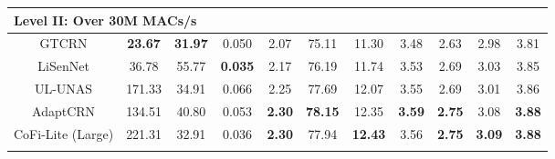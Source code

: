 \documentclass[journal]{IEEEtran}
\begin{document}
\begin{table}[t!]
{\begin{tabular}{ccccccccccc}
    \midrule
    
    \multicolumn{10}{l}{\textbf{Level II: Over 30M MACs/s}} \\
    \midrule

    GTCRN & \textbf{23.67} & \textbf{31.97} & 0.050 & 2.07 & 75.11 & 11.30 & 3.48 & 2.63 & 2.98 & 3.81 \\
    LiSenNet & 36.78 & 55.77 & \textbf{0.035} & 2.17 & 76.19 & 11.74 & 3.53 & 2.69 & 3.03 & 3.85 \\
    UL-UNAS & 171.33 & 34.91 & 0.066 & 2.25 & 77.69 & 12.07 & 3.55 & 2.69 & 3.01 & 3.86\\
    AdaptCRN & 134.51 & 40.80 & 0.053 & \textbf{2.30} & \textbf{78.15} & 12.35 & \textbf{3.59} & \textbf{2.75} & 3.08 & \textbf{3.88} \\
    CoFi-Lite (Large) & 221.31 & 32.91 & 0.036 & \textbf{2.30} & 77.94 & \textbf{12.43} & 3.56 & \textbf{2.75} & \textbf{3.09} & \textbf{3.88} \\
    
    \bottomrule
\label{tab:dns3}
\end{tabular}
}
\vspace{-1.8em}
\end{table}
\end{document}
